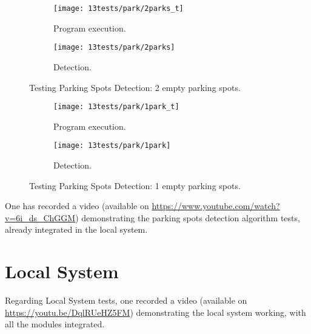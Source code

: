 \begin{figure}[H]
	\centering
	\begin{subfigure}{.5\textwidth}
		\centering
		\texttt{[image: 13tests/park/2parks\_t]}
		\caption{Program execution.}
		\label{fig:2parkst}
	\end{subfigure}%
	\begin{subfigure}{.4\textwidth}
		\centering
		\texttt{[image: 13tests/park/2parks]}
		\caption{Detection.}
		\label{fig:2parksim}
	\end{subfigure}
	\caption{Testing Parking Spots Detection: 2 empty parking spots.}
	\label{fig:2parks}
\end{figure}

\begin{figure}[H]
	\centering
	\begin{subfigure}{.5\textwidth}
		\centering
		\texttt{[image: 13tests/park/1park\_t]}
		\caption{Program execution.}
		\label{fig:1parkst}
	\end{subfigure}%
	\begin{subfigure}{.4\textwidth}
		\centering
		\texttt{[image: 13tests/park/1park]}
		\caption{Detection.}
		\label{fig:1parksim}
	\end{subfigure}
	\caption{Testing Parking Spots Detection: 1 empty parking spots.}
	\label{fig:1park}
\end{figure}

One has recorded a video (available on \url{https://www.youtube.com/watch?v=6i_ds_ChGGM}) demonstrating the parking spots detection algorithm tests, already integrated in the local system.


\section{Local System}
Regarding Local System tests, one recorded a video (available on \url{https://youtu.be/DqlRUeHZ5FM}) demonstrating the local system working, with all the modules integrated.

